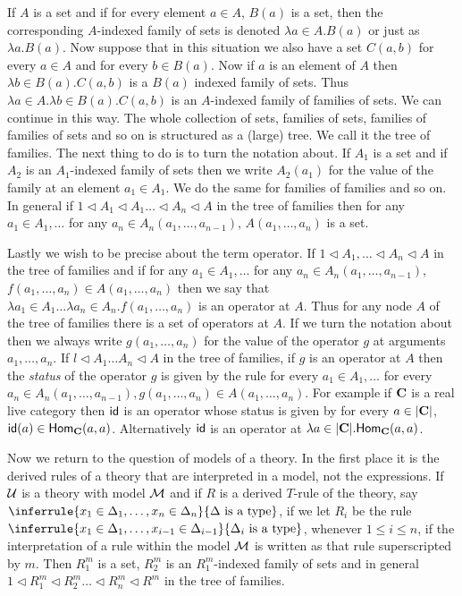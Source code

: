If $A$ is a set and if for every element $a\in A$, $B(a)$ is a set, then the corresponding $A$-indexed family of sets is denoted $\lambda a\in A.B(a)$ or just as $\lambda a . B(a)$.
%
Now suppose that in this situation we also have a set $C(a,b)$ for every $a\in A$ and for every $b\in B(a)$.
%
Now if $a$ is an element of $A$ then $\lambda b\in B(a).C(a,b)$ is a $B(a)$ indexed family of sets.
%
Thus $\lambda a\in A.\lambda b\in B(a). C(a,b)$ is an $A$-indexed family of families of sets.
%
We can continue in this way.
%
The whole collection of sets, families of sets, families of families of sets and so on is structured as a (large) tree.
%
We call it the tree of families.
%
The next thing to do is to turn the notation about.
%
If $A_1$ is a set and if $A_2$ is an $A_1$-indexed family of sets then we write $A_2(a_1)$ for the value of the family at an element $a_1\in A_1$.
%
We do the same for families of families and so on.
%
In general if $1\triangleleft A_1\triangleleft A_1\ldots\triangleleft A_n\triangleleft A$ in the tree of families then for any $a_1\in A_1,\ldots$ for any $a_n\in A_n(a_1,\ldots,a_{n-1})$, $A(a_1,\ldots,a_n)$ is a set.

Lastly we wish to be precise about the term operator.
%
If $1\triangleleft A_1,\ldots\triangleleft A_n\triangleleft A$ in the tree of families and if for any $a_1\in A_1,\ldots$ for any $a_n\in A_n(a_1,\ldots,a_{n-1})$, $f(a_1,\ldots,a_n)\in A(a_1,\ldots,a_n)$ then we say that $\lambda a_1\in A_1\ldots\lambda a_n\in A_n.f(a_1,\ldots,a_n)$ is an operator at $A$.
%
Thus for any node $A$ of the tree of families there is a set of operators at $A$.
%
If we turn the notation about then we always write $g(a_1,\ldots,a_n)$ for the value of the operator $g$ at arguments $a_1,\ldots,a_n$. If $l\triangleleft A_1\ldots A_n\triangleleft A$ in the tree of families, if $g$ is an operator at $A$ then the \emph{status} of the operator $g$ is given by the rule for every $a_1\in A_1,\ldots$ for every $a_n\in A_n(a_1,\ldots,a_{n-1}), g(a_1,\ldots, a_n)\in A(a_1,\ldots,a_n)$.
%
For example if $\mathbf{C}$ is a real live category then $\mathsf{id}$ is an operator whose status is given by for every $a\in |\mathbf{C}|$, $\mathsf{id}(a)\in\mathsf{Hom}_{\mathbf{C}}(a,a)$.
%
Alternatively $\mathsf{id}$ is an operator at $\lambda a\in |\mathbf{C}|.\mathsf{Hom}_{\mathbf{C}}(a,a)$.

Now we return to the question of models of a theory.
%
In the first place it is the derived rules of a theory that are interpreted in a model, not the expressions.
%
If $\mathcal{U}$ is a theory with model $\mathcal{M}$ and if $R$ is a derived $T$-rule of the theory, say $\inferrule{x_1\in\Delta_1,\ldots,x_n\in\Delta_n}{\Delta\isatype}$, if we let $R_i$ be the rule $\inferrule{x_1\in\Delta_1,\ldots,x_{i-1}\in\Delta_{i-1}}{\Delta_i\isatype}$, whenever $1\leq i\leq n$, if the interpretation of a rule within the model $\mathcal{M}$ is written as that rule superscripted by $m$.
%
Then $R_1^m$ is a set, $R_2^m$ is an $R_1^m$-indexed family of sets and in general $1\triangleleft R_1^m\triangleleft R_2^m\ldots\triangleleft R_n^m\triangleleft R^m$ in the tree of families.

